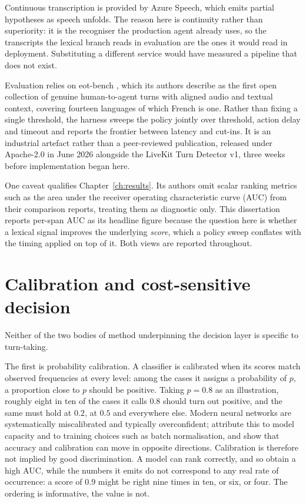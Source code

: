 Continuous transcription is provided by Azure Speech, which emits partial hypotheses as
speech unfolds. The reason here is continuity rather than superiority: it is the recogniser
the production agent already uses, so the transcripts the lexical branch reads in evaluation
are the ones it would read in deployment. Substituting a different service would have
measured a pipeline that does not exist.

Evaluation relies on eot-bench \citep{eotbench}, which its authors describe as the first
open collection of genuine human-to-agent turns with aligned audio and textual context,
covering fourteen languages of which French is one. Rather than fixing a single threshold,
the harness sweeps the policy jointly over threshold, action delay and timeout and reports
the frontier between latency and cut-ins. It is an industrial artefact rather than a
peer-reviewed publication, released under Apache-2.0 in June 2026 alongside the LiveKit Turn
Detector v1, three weeks before implementation began here.

One caveat qualifies Chapter~\ref{ch:results}. Its authors omit scalar ranking metrics such
as the area under the receiver operating characteristic curve (AUC) from their comparison
reports, treating them as diagnostic only. This dissertation reports per-span AUC as its
headline figure because the question here is whether a lexical signal improves the
underlying \emph{score}, which a policy sweep conflates with the timing applied on top of
it. Both views are reported throughout.

\section{Calibration and cost-sensitive decision}
\label{sec:calibration-lit}

Neither of the two bodies of method underpinning the decision layer is specific to
turn-taking.

The first is probability calibration. A classifier is calibrated when its scores match
observed frequencies at every level: among the cases it assigns a probability of $p$, a
proportion close to $p$ should be positive. Taking $p = 0.8$ as an illustration, roughly
eight in ten of the cases it calls $0.8$ should turn out positive, and the same must hold at
$0.2$, at $0.5$ and everywhere else. Modern neural networks
are systematically miscalibrated and typically overconfident;
\citet{guo2017calibration} attribute this to model capacity and to training choices such as
batch normalisation, and show that accuracy and calibration can move in opposite directions.
Calibration is therefore not implied by good discrimination. A model can rank correctly, and
so obtain a high AUC, while the numbers it emits do not correspond to any real rate of
occurrence: a score of $0.9$ might be right nine times in ten, or six, or four. The ordering
is informative, the value is not. 

